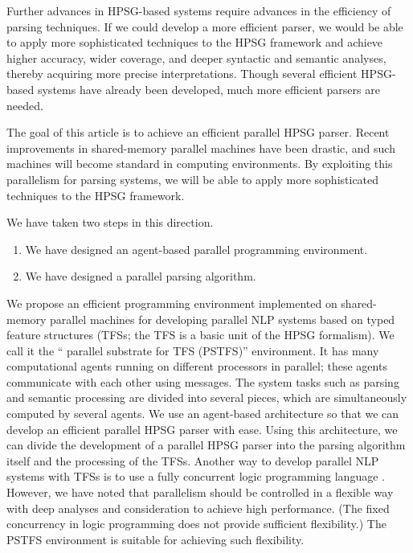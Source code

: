   Further advances in HPSG-based systems require advances in the
efficiency of parsing techniques.  If we could develop a more
efficient parser, we would be able to apply more sophisticated
techniques to the HPSG framework and achieve higher accuracy, wider
coverage, and deeper syntactic and semantic analyses, thereby
acquiring more precise interpretations.  Though several efficient
HPSG-based systems have already been developed, much more efficient
parsers are needed.

  The goal of this article is to achieve an efficient parallel HPSG
parser.  Recent improvements in shared-memory parallel machines have
been drastic, and such machines will become standard in computing
environments.  By exploiting this parallelism for parsing systems, we
will be able to apply more sophisticated techniques to the HPSG
framework.

  We have taken two steps in this direction.

\begin{enumerate}
\item We have designed an agent-based parallel programming environment.
\item We have designed a parallel parsing algorithm.
\end{enumerate}

  We propose an efficient programming environment implemented on
shared-memory parallel machines for developing parallel NLP systems
based on typed feature structures (TFSs; the TFS \cite{BOBCARPENTER}
is a basic unit of the HPSG formalism).  We call it the `` parallel
substrate for TFS (PSTFS)'' environment.  It has many computational
agents running on different processors in parallel; these agents
communicate with each other using messages.  The system tasks such as
parsing and semantic processing are divided into several pieces, which
are simultaneously computed by several agents.  We use an agent-based
architecture \cite{ACTOR,Yonezawa,Taura97} so that we can develop an
efficient parallel HPSG parser with ease.  Using this architecture, we
can divide the development of a parallel HPSG parser into the parsing
algorithm itself and the processing of the TFSs.  Another way to
develop parallel NLP systems with TFSs is to use a fully concurrent
logic programming language \cite{Clark86,GHC}.  However, we have noted
that parallelism should be controlled in a flexible way with deep
analyses and consideration to achieve high performance.  (The fixed
concurrency in logic programming does not provide sufficient
flexibility.)  The PSTFS environment is suitable for achieving such
flexibility.

